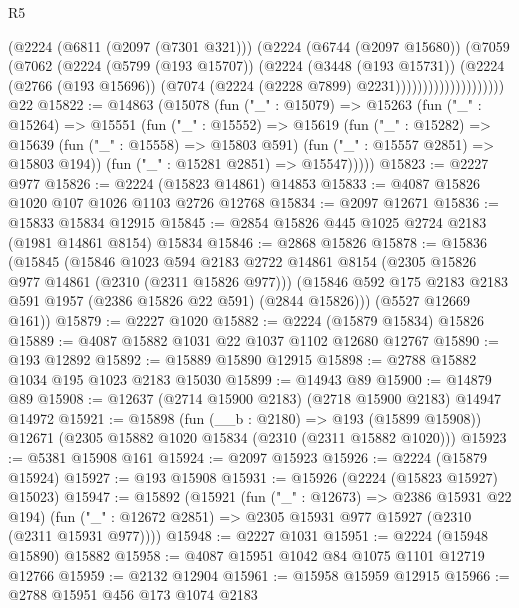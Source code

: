 \begin{lexlean}{R5}
\begin{coremodule}
                          (@2224
                            (@6811 (@2097 (@7301 @321)))
                            (@2224
                              (@6744 (@2097 @15680))
                              (@7059
                                (@7062
                                  (@2224
                                    (@5799 (@193 @15707))
                                    (@2224
                                      (@3448 (@193 @15731))
                                      (@2224
                                        (@2766 (@193 @15696))
                                        (@7074 (@2224 (@2228 @7899) @2231))))))))))))))))))))
    @22
@15822 := @14863
    (@15078
      (fun ("_" : @15079) =>
      @15263
        (fun ("_" : @15264) =>
        @15551
          (fun ("_" : @15552) =>
          @15619
            (fun ("_" : @15282) =>
            @15639 (fun ("_" : @15558) => @15803 @591) (fun ("_" : @15557 @2851) => @15803 @194))
            (fun ("_" : @15281 @2851) => @15547)))))
@15823 := @2227 @977
@15826 := @2224 (@15823 @14861) @14853
@15833 := @4087 @15826 @1020 @107 @1026 @1103 @2726 @12768
@15834 := @2097 @12671
@15836 := @15833 @15834 @12915
@15845 := @2854 @15826 @445 @1025 @2724 @2183 (@1981 @14861 @8154) @15834
@15846 := @2868 @15826
@15878 := @15836
    (@15845
      (@15846
        @1023
        @594
        @2183
        @2722
        @14861
        @8154
        (@2305 @15826 @977 @14861 (@2310 (@2311 @15826 @977)))
        (@15846 @592 @175 @2183 @2183 @591 @1957 (@2386 @15826 @22 @591) (@2844 @15826)))
      (@5527 @12669 @161))
@15879 := @2227 @1020
@15882 := @2224 (@15879 @15834) @15826
@15889 := @4087 @15882 @1031 @22 @1037 @1102 @12680 @12767
@15890 := @193 @12892
@15892 := @15889 @15890 @12915
@15898 := @2788 @15882 @1034 @195 @1023 @2183 @15030
@15899 := @14943 @89
@15900 := @14879 @89
@15908 := @12637 (@2714 @15900 @2183) (@2718 @15900 @2183) @14947 @14972
@15921 := @15898
    (fun (__b : @2180) => @193 (@15899 @15908))
    @12671
    (@2305 @15882 @1020 @15834 (@2310 (@2311 @15882 @1020)))
@15923 := @5381 @15908 @161
@15924 := @2097 @15923
@15926 := @2224 (@15879 @15924)
@15927 := @193 @15908
@15931 := @15926 (@2224 (@15823 @15927) @15023)
@15947 := @15892
    (@15921
      (fun ("_" : @12673) => @2386 @15931 @22 @194)
      (fun ("_" : @12672 @2851) => @2305 @15931 @977 @15927 (@2310 (@2311 @15931 @977))))
@15948 := @2227 @1031
@15951 := @2224 (@15948 @15890) @15882
@15958 := @4087 @15951 @1042 @84 @1075 @1101 @12719 @12766
@15959 := @2132 @12904
@15961 := @15958 @15959 @12915
@15966 := @2788 @15951 @456 @173 @1074 @2183

\end{coremodule}
\end{lexlean}
